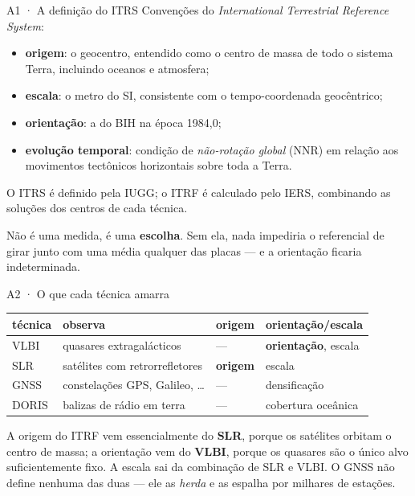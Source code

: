 \documentclass[aspectratio=169,11pt]{beamer}
\begin{document}
\begin{frame}{A1 · A definição do ITRS}
  \small
  Convenções do \emph{International Terrestrial Reference System}:
  \begin{itemize}
    \item \textbf{origem}: o geocentro, entendido como o centro de massa de todo o sistema
          Terra, incluindo oceanos e atmosfera;
    \item \textbf{escala}: o metro do SI, consistente com o tempo-coordenada geocêntrico;
    \item \textbf{orientação}: a do BIH na época 1984,0;
    \item \textbf{evolução temporal}: condição de \emph{não-rotação global} (NNR) em relação
          aos movimentos tectônicos horizontais sobre toda a Terra.
  \end{itemize}
  \medskip
  O ITRS é definido pela IUGG; o ITRF é calculado pelo IERS, combinando as soluções dos
  centros de cada técnica.
  \medskip
  \begin{cuidado}[title={A condição NNR}]
    Não é uma medida, é uma \textbf{escolha}. Sem ela, nada impediria o referencial de girar
    junto com uma média qualquer das placas --- e a orientação ficaria indeterminada.
  \end{cuidado}
\end{frame}

\begin{frame}{A2 · O que cada técnica amarra}
  \small
  \centering
  \renewcommand{\arraystretch}{1.4}
  \begin{tabular}{llll}
    \toprule
    técnica & observa & origem & orientação/escala \\
    \midrule
    VLBI & quasares extragalácticos & --- & \textbf{orientação}, escala \\
    SLR & satélites com retrorrefletores & \textbf{origem} & escala \\
    GNSS & constelações GPS, Galileo, \ldots & --- & densificação \\
    DORIS & balizas de rádio em terra & --- & cobertura oceânica \\
    \bottomrule
  \end{tabular}
  \flushleft
  \medskip
  A origem do ITRF vem essencialmente do \textbf{SLR}, porque os satélites orbitam o centro
  de massa; a orientação vem do \textbf{VLBI}, porque os quasares são o único alvo
  suficientemente fixo. A escala sai da combinação de SLR e VLBI. O GNSS não define nenhuma
  das duas --- ele as \emph{herda} e as espalha por milhares de estações.
\end{frame}
\end{document}
